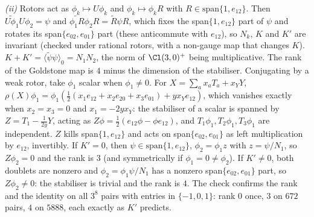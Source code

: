 \emph{(ii)} Rotors act as $\phi_{k} \mapsto U\phi_{k}$ and $\phi_{k} \mapsto \phi_{k}R$ with $R \in \mathrm{span}\{1, e_{12}\}$. Then $\widetilde{U\phi_{1}}U\phi_{2} = \psi$ and $\widetilde{\phi_{1}R}\phi_{2}R = \widetilde{R}\psi R$, which fixes the span$\{1, e_{12}\}$ part of $\psi$ and rotates its span$\{e_{02}, e_{01}\}$ part (these anticommute with $e_{12}$), so $N_{k}$, $K$ and $K'$ are invariant (checked under rational rotors, with a non-gauge map that changes $K$). $K + K' = \langle\widetilde{\psi}\psi\rangle_{0} = N_{1}N_{2}$, the norm of $\Cl(3,0)^{+}$ being multiplicative. The rank of the Goldstone map is $4$ minus the dimension of the stabiliser. Conjugating by a weak rotor, take $\phi_{1}$ scalar when $\phi_{1} \ne 0$. For $X = \sum_{a}x_{a}T_{a} + x_{Y}Y$, $\rho(X)\phi_{1} = \phi_{1}(\tfrac12(x_{1}e_{12} + x_{2}e_{20} + x_{3}e_{01}) + yx_{Y}e_{12})$, which vanishes exactly when $x_{2} = x_{3} = 0$ and $x_{1} = -2yx_{Y}$: the stabiliser of a scalar is spanned by $Z = T_{1} - \tfrac{1}{2y}Y$, acting as $Z\phi = \tfrac12(e_{12}\phi - \phi e_{12})$, and $T_{1}\phi_{1}, T_{2}\phi_{1}, T_{3}\phi_{1}$ are independent. $Z$ kills span$\{1, e_{12}\}$ and acts on span$\{e_{02}, e_{01}\}$ as left multiplication by $e_{12}$, invertibly. If $K' = 0$, then $\psi \in \mathrm{span}\{1, e_{12}\}$, $\phi_{2} = \phi_{1}z$ with $z = \psi/N_{1}$, so $Z\phi_{2} = 0$ and the rank is $3$ (and symmetrically if $\phi_{1} = 0 \ne \phi_{2}$). If $K' \ne 0$, both doublets are nonzero and $\phi_{2} = \phi_{1}\psi/N_{1}$ has a nonzero span$\{e_{02}, e_{01}\}$ part, so $Z\phi_{2} \ne 0$: the stabiliser is trivial and the rank is $4$. The check confirms the rank and the identity on all $3^{8}$ pairs with entries in $\{-1, 0, 1\}$: rank $0$ once, $3$ on $672$ pairs, $4$ on $5888$, each exactly as $K'$ predicts.

